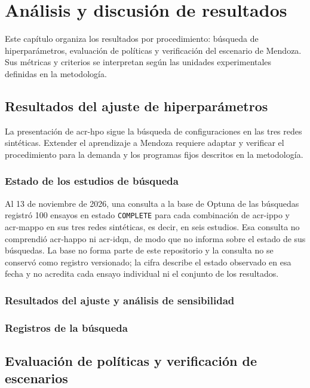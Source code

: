 \chapter{Análisis y discusión de resultados}
\label{capitulo:resultados}
Este capítulo organiza los resultados por procedimiento: búsqueda de hiperparámetros, evaluación de políticas y verificación del escenario de Mendoza. Sus métricas y criterios se interpretan según las unidades experimentales definidas en la metodología.

\section{Resultados del ajuste de hiperparámetros}

La presentación de \acrshort{acr-hpo} sigue la búsqueda de configuraciones en las tres redes sintéticas. Extender el aprendizaje a Mendoza requiere adaptar y verificar el procedimiento para la demanda y los programas fijos descritos en la metodología.

\subsection{Estado de los estudios de búsqueda}

Al 13 de noviembre de 2026, una consulta a la base de Optuna de las búsquedas registró 100 ensayos en estado \texttt{COMPLETE} para cada combinación de \acrshort{acr-ippo} y \acrshort{acr-mappo} en sus tres redes sintéticas, es decir, en seis estudios. Esa consulta no comprendió \acrshort{acr-happo} ni \acrshort{acr-idqn}, de modo que no informa sobre el estado de sus búsquedas. La base no forma parte de este repositorio y la consulta no se conservó como registro versionado; la cifra describe el estado observado en esa fecha y no acredita cada ensayo individual ni el conjunto de los resultados.

\subsection{Resultados del ajuste y análisis de sensibilidad}

\subsection[Registros de la búsqueda]{Registros de la búsqueda}

\section{Evaluación de políticas y verificación de escenarios}

